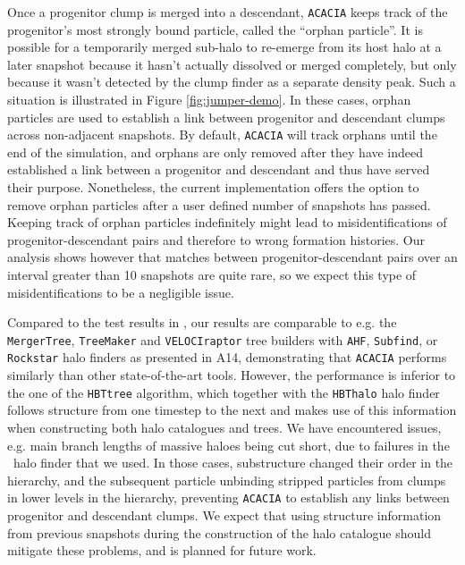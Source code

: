 Once a progenitor  clump is merged into  a descendant, \texttt{ACACIA}
keeps track of the progenitor's most strongly bound particle, called the
``orphan particle''.  It is possible for a temporarily merged sub-halo
to re-emerge from its host halo  at a later snapshot because it hasn't
actually dissolved  or merged completely,  but only because  it wasn't
detected  by the  clump finder  as a  separate density  peak.  Such  a
situation  is illustrated  in Figure  \ref{fig:jumper-demo}. In  these
cases,  orphan  particles  are  used   to  establish  a  link  between
progenitor  and  descendant   clumps  across  non-adjacent  snapshots.
By  default, \texttt{ACACIA} will track orphans until the end of the 
simulation, and orphans are only removed after they have indeed established
a link between a progenitor and descendant and thus have served their
purpose. Nonetheless, the current implementation 
offers the option to remove orphan particles after a user defined number
of snapshots has passed. Keeping track of orphan particles indefinitely
might lead to misidentifications of progenitor-descendant pairs and 
therefore to wrong formation histories. Our analysis shows however that 
matches between progenitor-descendant pairs over an interval greater 
than 10 snapshots are quite rare, so we expect this type of 
misidentifications to be a negligible issue. 

Compared to the test results in \citet{SUSSING_HALOFINDER}, our results 
are comparable to e.g. the \texttt{MergerTree}, \texttt{TreeMaker} and 
\texttt{VELOCIraptor} tree builders with \texttt{AHF}, \texttt{Subfind},
or \texttt{Rockstar} halo finders as presented in A14, demonstrating that
\texttt{ACACIA} performs similarly than other state-of-the-art tools.
However, the performance is inferior to the one of the \texttt{HBTtree}
algorithm, which together with the \texttt{HBThalo} halo finder follows
structure from one timestep to the next and makes use of this information
when constructing both halo catalogues and trees. We have encountered
issues, e.g. main branch lengths of massive haloes being cut short, due
to failures in the \phew\ halo finder that we used. In those cases, 
substructure changed their order in the hierarchy, and the subsequent
particle unbinding stripped particles from clumps in lower levels in the
hierarchy, preventing \texttt{ACACIA} to establish any links between
progenitor and descendant clumps. 
We expect that using structure information from previous snapshots during
the construction of the halo catalogue should mitigate these problems, and 
is planned for future work.

